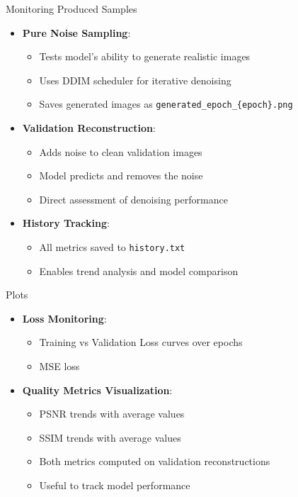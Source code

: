 \begin{frame}{Monitoring Produced Samples}
    \begin{itemize}
        \item \textbf{Pure Noise Sampling}:
              \begin{itemize}
                  \item Tests model's ability to generate realistic images
                  \item Uses DDIM scheduler for iterative denoising
                  \item Saves generated images as \texttt{generated\_epoch\_\{epoch\}.png}
              \end{itemize}
        \item \textbf{Validation Reconstruction}:
              \begin{itemize}
                  \item Adds noise to clean validation images
                  \item Model predicts and removes the noise
                  \item Direct assessment of denoising performance
              \end{itemize}
        \item \textbf{History Tracking}:
              \begin{itemize}
                  \item All metrics saved to \texttt{history.txt}
                  \item Enables trend analysis and model comparison
              \end{itemize}
    \end{itemize}
\end{frame}

\begin{frame}{Plots}
    \begin{itemize}
        \item \textbf{Loss Monitoring}:
              \begin{itemize}
                  \item Training vs Validation Loss curves over epochs
                  \item MSE loss
              \end{itemize}
        \item \textbf{Quality Metrics Visualization}:
              \begin{itemize}
                  \item PSNR trends with average values
                  \item SSIM trends with average values
                  \item Both metrics computed on validation reconstructions
                  \item Useful to track model performance
              \end{itemize}
    \end{itemize}
\end{frame}

